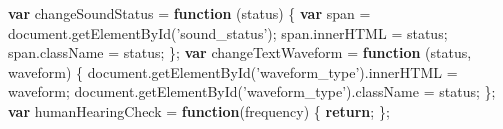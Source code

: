 \documentclass[]{article}
\newenvironment{Shaded}{}{}
\newcommand{\KeywordTok}[1]{\textcolor[rgb]{0.00,0.44,0.13}{\textbf{#1}}}
\newcommand{\StringTok}[1]{\textcolor[rgb]{0.25,0.44,0.63}{#1}}
\newcommand{\VariableTok}[1]{\textcolor[rgb]{0.10,0.09,0.49}{#1}}
\newcommand{\ControlFlowTok}[1]{\textcolor[rgb]{0.00,0.44,0.13}{\textbf{#1}}}
\newcommand{\OperatorTok}[1]{\textcolor[rgb]{0.40,0.40,0.40}{#1}}
\newcommand{\AttributeTok}[1]{\textcolor[rgb]{0.49,0.56,0.16}{#1}}
\newcommand{\NormalTok}[1]{#1}
\begin{document}
\begin{Shaded}
\begin{Highlighting}[]
\KeywordTok{var}\NormalTok{ changeSoundStatus }\OperatorTok{=} \KeywordTok{function}\NormalTok{ (status) }\OperatorTok{\{}
    \KeywordTok{var}\NormalTok{ span }\OperatorTok{=} \VariableTok{document}\NormalTok{.}\AttributeTok{getElementById}\NormalTok{(}\StringTok{'sound_status'}\NormalTok{)}\OperatorTok{;}
    \VariableTok{span}\NormalTok{.}\AttributeTok{innerHTML} \OperatorTok{=}\NormalTok{ status}\OperatorTok{;}
    \VariableTok{span}\NormalTok{.}\AttributeTok{className} \OperatorTok{=}\NormalTok{ status}\OperatorTok{;}
\OperatorTok{\};}
\KeywordTok{var}\NormalTok{ changeTextWaveform }\OperatorTok{=} \KeywordTok{function}\NormalTok{ (status}\OperatorTok{,}\NormalTok{ waveform) }\OperatorTok{\{}
    \VariableTok{document}\NormalTok{.}\AttributeTok{getElementById}\NormalTok{(}\StringTok{'waveform_type'}\NormalTok{).}\AttributeTok{innerHTML} \OperatorTok{=}\NormalTok{ waveform}\OperatorTok{;}
    \VariableTok{document}\NormalTok{.}\AttributeTok{getElementById}\NormalTok{(}\StringTok{'waveform_type'}\NormalTok{).}\AttributeTok{className} \OperatorTok{=}\NormalTok{ status}\OperatorTok{;}
\OperatorTok{\};}
\KeywordTok{var}\NormalTok{ humanHearingCheck }\OperatorTok{=} \KeywordTok{function}\NormalTok{(frequency) }\OperatorTok{\{}
    \ControlFlowTok{return}\OperatorTok{;}
\OperatorTok{\};}
\end{Highlighting}
\end{Shaded}
\end{document}
